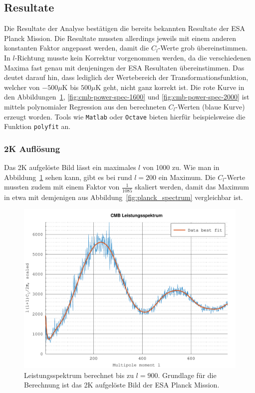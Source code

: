 \subsection{Resultate \label{subsec:cmb:results}}

Die Resultate der Analyse bestätigen die bereits bekannten Resultate der ESA 
Planck Mission. Die Resultate mussten allerdings jeweils mit einem anderen 
konstanten Faktor angepasst werden, damit die $C_l$-Werte grob übereinstimmen. 
In $l$-Richtung musste kein Korrektur vorgenommen werden, da die verschiedenen 
Maxima fast genau mit denjeningen der ESA Resultaten übereinstimmen. Das 
deutet darauf hin, dass lediglich der Wertebereich der Transformationsfunktion, 
welcher von $-500\mu\text{K}$ bis $500\mu\text{K}$ geht, nicht ganz korrekt 
ist. Die rote Kurve in den Abbildungen~\ref{fig:cmb-power-spec-900}, 
\ref{fig:cmb-power-spec-1600} und \ref{fig:cmb-power-spec-2000} ist mittels 
polynomialer Regression aus den berechneten $C_l$-Werten (blaue Kurve) erzeugt 
worden. Tools wie \texttt{Matlab} oder \texttt{Octave} bieten hierfür 
beispielsweise die Funktion \texttt{polyfit} an.

\subsubsection{2K Auflösung}

Das 2K aufgelöste Bild lässt ein maximales $l$ von 1000 zu. Wie man in 
Abbildung~\ref{fig:cmb-power-spec-900} sehen kann, gibt es bei rund $l = 200$ 
ein Maximum. Die $C_l$-Werte mussten zudem mit einem Faktor von 
$\frac{1}{1085}$ skaliert werden, damit das Maximum in etwa mit demjenigen aus 
Abbildung~\ref{fig:planck_spectrum} vergleichbar ist.

\begin{figure}
	\centering
	\includegraphics[width=\linewidth]{cmb/data/2k900-500.pdf}
	\caption{Leistungsspektrum berechnet bis zu $l = 900$. Grundlage für die 
		Berechnung ist das 2K aufgelöste Bild der ESA Planck Mission.}
	\label{fig:cmb-power-spec-900}
\end{figure}

